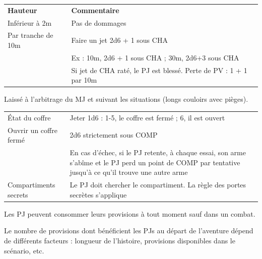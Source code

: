 \begin{frame}[b]
{\begin{minipage}[c][0.95\textheight][c]{\linewidth}

\vspace{0.2cm}

\begin{tabular}{lp{5.8cm}}
\textbf{Hauteur} & \textbf{Commentaire} \\
Inférieur à 2m     & Pas de dommages                                                   \\
Par tranche de 10m & Faire un jet 2d6 + 1 sous CHA                                     \\
                   & Ex : 10m, 2d6 + 1 sous CHA ; 30m, 2d6+3 sous CHA                  \\
                   & Si jet de CHA raté, le PJ est blessé. Perte de PV : 1 + 1 par 10m \\
\end{tabular}

\vspace{0.2cm}


\myindent Laissé à l'arbitrage du MJ et suivant les situations (longs couloirs avec pièges).


\vspace{0.2cm}

\begin{tabular}{>{\raggedright}p{2cm}p{6cm}}
État du coffre         & Jeter 1d6 : 1-5, le coffre est fermé ; 6, il est ouvert \\
Ouvrir un coffre fermé & 2d6 strictement sous COMP \\
                       & En cas d'échec, si le PJ retente, à chaque essai, son arme s'abîme et le PJ perd un point de COMP par tentative jusqu'à ce qu'il trouve une autre arme \\
Compartiments secrets & Le PJ doit chercher le compartiment. La règle des portes secrètes s'applique \\
\end{tabular}

\vspace{0.2cm}


\myindent Les PJ peuvent consommer leurs provisions à tout moment sauf dans un combat.

\myindent Le nombre de provisions dont bénéficient les PJs au départ de l'aventure dépend de différents facteurs : longueur de l'histoire, provisions disponibles dans le scénario, etc.


\end{minipage}}
\end{frame}
